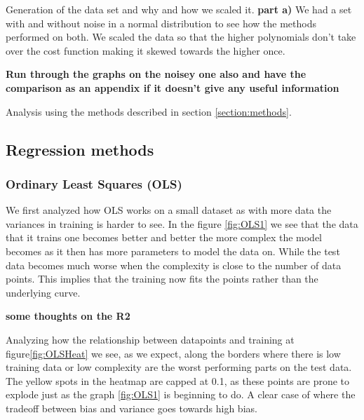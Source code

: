\documentclass[amssymb,twocolumn,aps]{revtex4}
\begin{document}
Generation of the data set and why and how we scaled it. \textbf{part a)}
We had a set with and without noise in a normal distribution to see how the methods performed on both.
We scaled the data so that the higher polynomials don't take over the cost function making it skewed towards the higher once.

\textbf{Run through the graphs on the noisey one also and have the comparison as an appendix if it doesn't give any useful information}


Analysis using the methods described in section \ref{section:methods}.

\subsection{Regression methods}

\subsubsection{Ordinary Least Squares (OLS)}



We first analyzed how OLS works on a small dataset as with more data the variances in training is harder to see. In the figure \ref{fig:OLS1} we see that the data that it trains one becomes better and better the more complex the model becomes as it then has more parameters to model the data on. While the test data becomes much worse when the complexity is close to the number of data points. This implies that the training now fits the points rather than the underlying curve.

\textbf{some thoughts on the R2}


Analyzing how the relationship between datapoints and training at figure\ref{fig:OLSHeat} we see, as we expect, along the borders where there is low training data or low complexity are the worst performing parts on the test data. The yellow spots in the heatmap are capped at 0.1, as these points are prone to explode just as the graph \ref{fig:OLS1} is beginning to do.
A clear case of where the tradeoff between bias and variance goes towards high bias.
\end{document}
